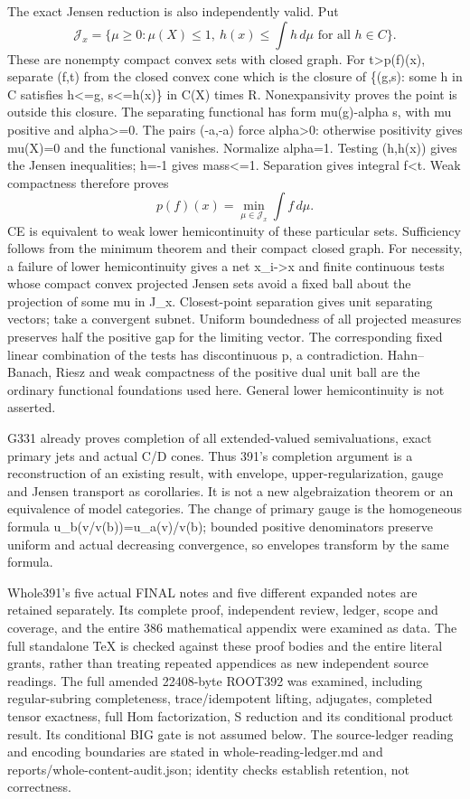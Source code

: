 \documentclass[11pt]{article}
\begin{document}
The exact Jensen reduction is also independently valid. Put
\[
\mathcal J_x=\{\mu\ge0:\mu(X)\le1,\ h(x)\le\int h\,d\mu\text{ for all }h\in C\}.
\]
These are nonempty compact convex sets with closed graph. For t>p(f)(x), separate (f,t) from the closed convex cone which is the closure of \{(g,s): some h in C satisfies h<=g, s<=h(x)\} in C(X) times R. Nonexpansivity proves the point is outside this closure. The separating functional has form mu(g)-alpha s, with mu positive and alpha>=0. The pairs (-a,-a) force alpha>0: otherwise positivity gives mu(X)=0 and the functional vanishes. Normalize alpha=1. Testing (h,h(x)) gives the Jensen inequalities; h=-1 gives mass<=1. Separation gives integral f<t. Weak compactness therefore proves
\[
p(f)(x)=\min_{\mu\in\mathcal J_x}\int f\,d\mu.
\]
CE is equivalent to weak lower hemicontinuity of these particular sets. Sufficiency follows from the minimum theorem and their compact closed graph. For necessity, a failure of lower hemicontinuity gives a net x\_i->x and finite continuous tests whose compact convex projected Jensen sets avoid a fixed ball about the projection of some mu in J\_x. Closest-point separation gives unit separating vectors; take a convergent subnet. Uniform boundedness of all projected measures preserves half the positive gap for the limiting vector. The corresponding fixed linear combination of the tests has discontinuous p, a contradiction. Hahn--Banach, Riesz and weak compactness of the positive dual unit ball are the ordinary functional foundations used here. General lower hemicontinuity is not asserted.

G331 already proves completion of all extended-valued semivaluations, exact primary jets and actual C/D cones. Thus 391's completion argument is a reconstruction of an existing result, with envelope, upper-regularization, gauge and Jensen transport as corollaries. It is not a new algebraization theorem or an equivalence of model categories. The change of primary gauge is the homogeneous formula u\_b(v/v(b))=u\_a(v)/v(b); bounded positive denominators preserve uniform and actual decreasing convergence, so envelopes transform by the same formula.

Whole391's five actual FINAL notes and five different expanded notes are retained separately. Its complete proof, independent review, ledger, scope and coverage, and the entire 386 mathematical appendix were examined as data. The full standalone TeX is checked against these proof bodies and the entire literal grants, rather than treating repeated appendices as new independent source readings. The full amended 22408-byte ROOT392 was examined, including regular-subring completeness, trace/idempotent lifting, adjugates, completed tensor exactness, full Hom factorization, S reduction and its conditional product result. Its conditional BIG gate is not assumed below. The source-ledger reading and encoding boundaries are stated in whole-reading-ledger.md and reports/whole-content-audit.json; identity checks establish retention, not correctness.
\end{document}
